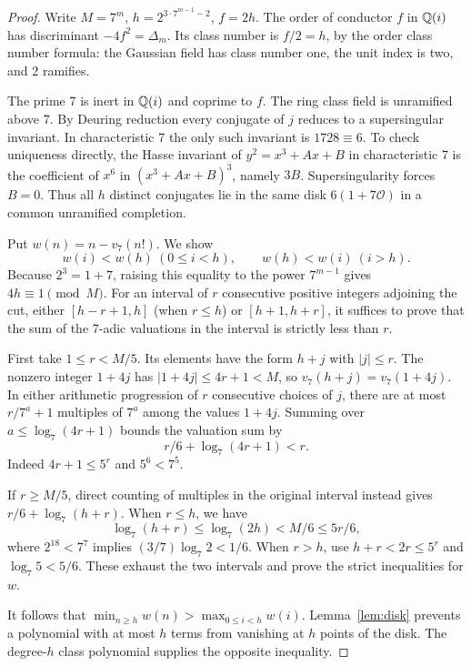 \begin{proof}
Write $M=7^m$, $h=2^{3\cdot7^{m-1}-2}$, $f=2h$. The order of conductor $f$ in $\mathbb Q(i)$ has discriminant $-4f^2=\Delta_m$. Its class number is $f/2=h$, by the order class number formula: the Gaussian field has class number one, the unit index is two, and 2 ramifies.

The prime 7 is inert in $\mathbb Q(i)$ and coprime to $f$. The ring class field is unramified above 7. By Deuring reduction every conjugate of $j$ reduces to a supersingular invariant. In characteristic 7 the only such invariant is $1728\equiv6$. To check uniqueness directly, the Hasse invariant of $y^2=x^3+Ax+B$ in characteristic 7 is the coefficient of $x^6$ in $(x^3+Ax+B)^3$, namely $3B$. Supersingularity forces $B=0$. Thus all $h$ distinct conjugates lie in the same disk $6(1+7\mathcal O)$ in a common unramified completion.\cite{cmred}

Put $w(n)=n-v_7(n!)$. We show
\[
  w(i)<w(h)\ (0\le i<h),\qquad w(h)<w(i)\ (i>h).
\]
Because $2^3=1+7$, raising this equality to the power $7^{m-1}$ gives $4h\equiv1\pmod M$. For an interval of $r$ consecutive positive integers adjoining the cut, either $[h-r+1,h]$ (when $r\le h$) or $[h+1,h+r]$, it suffices to prove that the sum of the 7-adic valuations in the interval is strictly less than $r$.

First take $1\le r<M/5$. Its elements have the form $h+j$ with $|j|\le r$. The nonzero integer $1+4j$ has $|1+4j|\le4r+1<M$, so $v_7(h+j)=v_7(1+4j)$. In either arithmetic progression of $r$ consecutive choices of $j$, there are at most $r/7^a+1$ multiples of $7^a$ among the values $1+4j$. Summing over $a\le\log_7(4r+1)$ bounds the valuation sum by
\[
    r/6+\log_7(4r+1)<r .
\]
Indeed $4r+1\le5^r$ and $5^6<7^5$.

If $r\ge M/5$, direct counting of multiples in the original interval instead gives $r/6+\log_7(h+r)$. When $r\le h$, we have
\[
 \log_7(h+r)\le\log_7(2h)<M/6\le5r/6 ,
\]
where $2^{18}<7^7$ implies $(3/7)\log_7 2<1/6$. When $r>h$, use $h+r<2r\le 5^r$ and $\log_7 5<5/6$. These exhaust the two intervals and prove the strict inequalities for $w$.

It follows that $\min_{n\ge h} w(n)>\max_{0\le i<h}w(i)$. Lemma~\ref{lem:disk} prevents a polynomial with at most $h$ terms from vanishing at $h$ points of the disk. The degree-$h$ class polynomial supplies the opposite inequality.
\end{proof}

